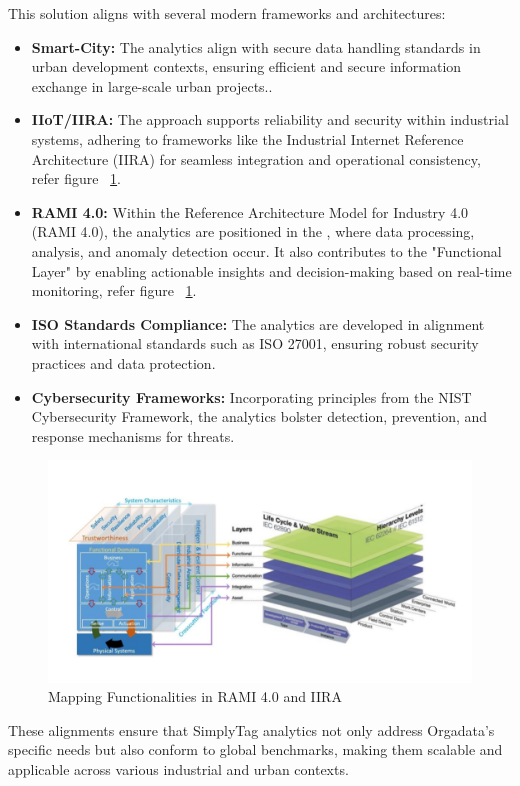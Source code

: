 This solution aligns with several modern frameworks and architectures:

\begin{itemize}
	\item \textbf{Smart-City:} The analytics align with secure data handling standards in urban development contexts, ensuring efficient and secure information exchange in large-scale urban projects..
	\item \textbf{IIoT/IIRA:} The approach supports reliability and security within industrial systems, adhering to frameworks like the Industrial Internet Reference Architecture (IIRA) for seamless integration and operational consistency, refer figure ~\ref{RAMI_IIRA}.
	\item \textbf{RAMI 4.0:} Within the Reference Architecture Model for Industry 4.0 (RAMI 4.0), the analytics are positioned in the , where data processing, analysis, and anomaly detection occur. It also contributes to the "Functional Layer" by enabling actionable insights and decision-making based on real-time monitoring, refer figure ~\ref{RAMI_IIRA}.
	\item \textbf{ISO Standards Compliance:} The analytics are developed in alignment with international standards such as ISO 27001, ensuring robust security practices and data protection.
	\item \textbf{Cybersecurity Frameworks:} Incorporating principles from the NIST Cybersecurity Framework, the analytics bolster detection, prevention, and response mechanisms for threats.
\end{itemize}

\begin{figure}
	\begin{center}
		\includegraphics[width=0.7\linewidth]{Images/RAMI_IIRA.png}
		\caption{Mapping Functionalities in RAMI 4.0 and IIRA}
		\label{RAMI_IIRA}
	\end{center}
\end{figure}

These alignments ensure that SimplyTag analytics not only address Orgadata’s specific needs but also conform to global benchmarks, making them scalable and applicable across various industrial and urban contexts.


\newpage
